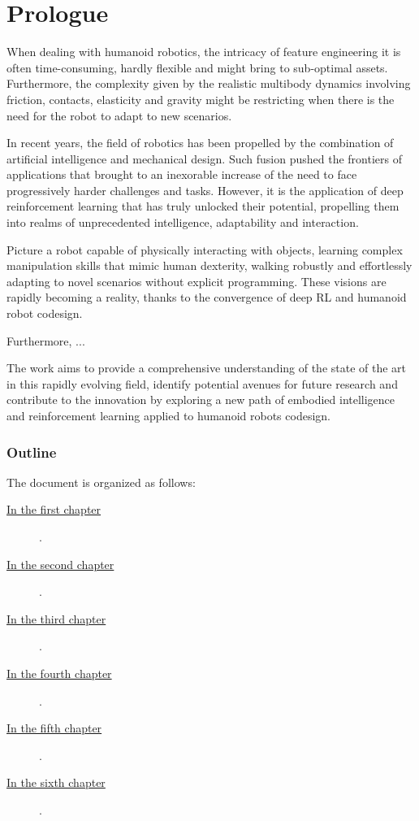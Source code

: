 \chapter*{Prologue}
\label{ch:prologue}

When dealing with humanoid robotics, the intricacy of feature engineering it is often time-consuming, hardly flexible and might bring to sub-optimal assets. Furthermore, the complexity given by the realistic multibody dynamics involving friction, contacts, elasticity and gravity might be restricting when there is the need for the robot to adapt to new scenarios.

In recent years, the field of robotics has been propelled by the combination of artificial intelligence and mechanical design. Such fusion pushed the frontiers of applications that brought to an inexorable increase of the need to face progressively harder challenges and tasks. However, it is the application of deep reinforcement learning that has truly unlocked their potential, propelling them into realms of unprecedented intelligence, adaptability and interaction.

Picture a robot capable of physically interacting with objects, learning complex manipulation skills that mimic human dexterity, walking robustly and effortlessly adapting to novel scenarios without explicit programming. These visions are rapidly becoming a reality, thanks to the convergence of deep \ac{RL} and humanoid robot codesign.

Furthermore, ...

The work aims to provide a comprehensive understanding of the state of the art in this rapidly evolving field, identify potential avenues for future research and contribute to the innovation by exploring a new path of embodied intelligence and reinforcement learning applied to humanoid robots codesign.

\clearpage

\subsection*{Outline}
%
The document is organized as follows:
%
%
\begin{description}

    \item[{\hyperref[chp:03-PhysicsSimulators]{In the first chapter}}] \lipsum[1].
    \item[{\hyperref[chp:03-PhysicsSimulators]{In the second chapter}}] \lipsum[2].
    \item[{\hyperref[chp:03-PhysicsSimulators]{In the third chapter}}] \lipsum[3].
    \item[{\hyperref[chp:03-PhysicsSimulators]{In the fourth chapter}}] \lipsum[4].
    \item[{\hyperref[chp:03-PhysicsSimulators]{In the fifth chapter}}] \lipsum[5].
    \item[{\hyperref[chp:03-PhysicsSimulators]{In the sixth chapter}}] \lipsum[6].



\end{description}